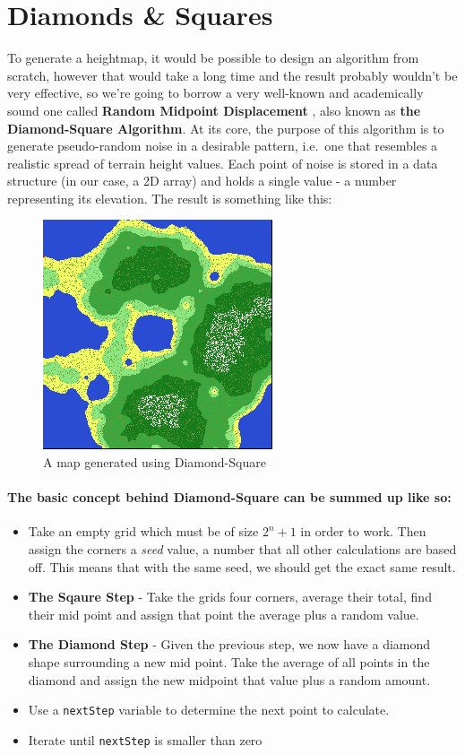 \documentclass{article}
\begin{document}
	
\section{Diamonds \& Squares}\label{diamonds-squares}


To generate a heightmap, it would be possible to design an algorithm from scratch, however that would take a long time and the result probably wouldn't be very effective, so we're going to borrow a very well-known and academically sound one called \textbf{Random Midpoint Displacement} \parencite[2]{fournier}, also known as \textbf{the Diamond-Square Algorithm}. At its core, the purpose of this algorithm is to generate pseudo-random noise in a desirable pattern, i.e.~one that resembles a realistic spread of terrain height values. Each point of noise is stored in a data structure (in our case, a 2D array) and holds a single value - a number representing its elevation. The result is something like this:
	
\begin{figure}[H]
	\centering
	\includegraphics{map.jpg}
	\renewcommand{\figurename}{Example}
	\caption{A map generated using Diamond-Square}
\end{figure}

\paragraph{The basic concept behind Diamond-Square can be summed up like so:}
	
\begin{itemize}
	\item
		Take an empty grid which must be of size \(2^{n}+1\) in order to work. Then assign the corners a \emph{seed} value, a number that all other calculations are based off. This means 				that with the same seed, we should get the exact same result.
	\item
		\textbf{The Sqaure Step} - Take the grids four corners, average their total, find their mid point and assign that point the average plus a random value.
	\item
		\textbf{The Diamond Step} - Given the previous step, we now have a diamond shape surrounding a new mid point. Take the average of all points in the diamond and assign the new 			midpoint that value plus a random amount.
	\item
		Use a \texttt{nextStep} variable to determine the next point to calculate. 
	\item
		Iterate until \texttt{nextStep} is smaller than zero
\end{itemize}
	
\end{document}
